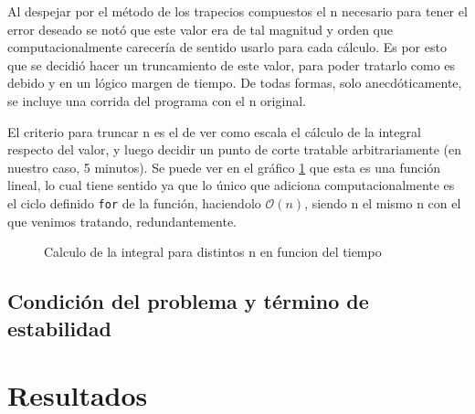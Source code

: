 \documentclass[11pt,a4paper]{article}
\begin{document}
Al despejar por el método de los trapecios compuestos el n necesario para tener el error deseado se notó que este valor era de tal magnitud y orden que computacionalmente carecería de sentido usarlo para cada cálculo. Es por esto que se decidió hacer un truncamiento de este valor, para poder tratarlo como es debido y en un lógico margen de tiempo. De todas formas, solo anecdóticamente, se incluye una corrida del programa con el n original.

El criterio para truncar n es el de ver como escala el cálculo de la integral respecto del valor, y luego decidir un punto de corte tratable arbitrariamente (en nuestro caso, 5 minutos). Se puede ver en el gráfico \ref{fig:calcularn} que esta es una función lineal, lo cual tiene sentido ya que lo único que adiciona computacionalmente es el ciclo definido \texttt{for} de la función, haciendolo \(\mathcal{O}(n)\), siendo n el mismo n con el que venimos tratando, redundantemente.

\begin{figure}[H]
	\caption{Calculo de la integral para distintos n en funcion del tiempo}
	\label{fig:calcularn}
\end{figure}

\subsection{Condición del problema y término de estabilidad}

\section{Resultados}
\end{document}
